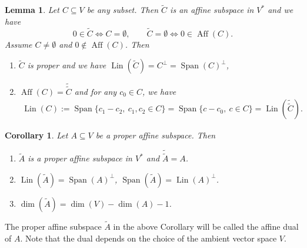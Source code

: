 \documentclass[12pt]{article}
\newtheorem{lemma}{Lemma}
\newtheorem{coro}{Corollary}
\theoremstyle{definition}
\theoremstyle{remark}
\def\aff{\operatorname{Aff}}
\def\lin{\operatorname{Lin}}
\def\Span{\operatorname{Span}}
\begin{document}
\begin{lemma}\label{lemma:dual} Let $C\subseteq V$ be any subset. Then $\tilde C$ is an affine subspace in 
$V^*$ and we have
\[
0\in \tilde C \iff C= \emptyset, \qquad \tilde C=\emptyset\iff 0\in \aff(C).
\]
Assume $C\ne \emptyset$ and $0\notin \aff(C)$. Then
\begin{enumerate}
\item[(i)] $\tilde C$ is proper and we have $\lin(\tilde C)=C^\perp=\Span(C)^\perp$,
\item[(ii)] $\aff(C)=\tilde{\tilde C}$ and for any $c_0\in
C$, we have
\begin{align*}
\lin(C):= \Span\{c_1-c_2,\ c_1,c_2\in C\}=\Span\{c-c_0,\ c\in C\}=\lin(\tilde{\tilde C}).
\end{align*}

\end{enumerate}


\end{lemma}

\begin{coro}\label{coro:dual} Let $A\subseteq V$ be a proper affine subspace. Then 
\begin{enumerate}
\item[(i)] $\tilde A$ is a proper affine subspace in $V^*$ and $\tilde{\tilde A}=A$.
\item[(ii)] $\lin(\tilde A)=\Span(A)^\perp$, $\Span(\tilde A)=\lin(A)^\perp$.
\item[(iii)] $\dim(\tilde A)=\dim(V)-\dim(A)-1$.
\end{enumerate}


\end{coro}

The proper affine subspace $\tilde A$ in the above Corollary will be called the affine dual
of $A$. Note that the dual depends on the choice of the ambient vector space $V$.
\end{document}
